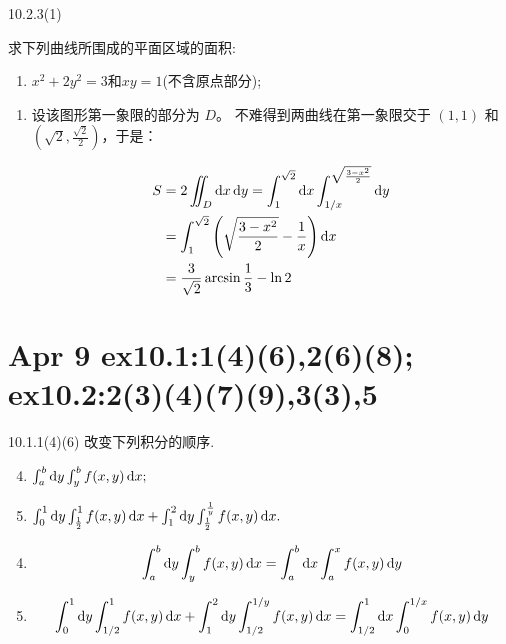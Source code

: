 \begin{exercise}
    {10.2.3(1)}

    求下列曲线所围成的平面区域的面积:
    \begin{enumerate}
        \item $x^2+2y^2 = 3$和$xy=1$(不含原点部分);
    \end{enumerate}
\end{exercise}

\begin{solution}
    \begin{enumerate}
        \item 设该图形第一象限的部分为 $D$。  
        不难得到两曲线在第一象限交于 $(1, 1)$ 和 $\left( \sqrt{2}, \frac{\sqrt{2}}{2} \right)$，于是：
        
        \begin{align*}
        S &= 2 \iint_D \operatorname{d\!} x \operatorname{d\!} y 
        = \int_1^{\sqrt{2}} \operatorname{d\!} x \int_{1/x}^{\sqrt{\frac{3 - x^2}{2}}} \operatorname{d\!} y \\
        &= \int_1^{\sqrt{2}} \left( \sqrt{\frac{3 - x^2}{2}} - \frac{1}{x} \right) \operatorname{d\!} x \\
        &= \frac{3}{\sqrt{2}} \arcsin \frac{1}{3} - \ln 2
        \end{align*}
    \end{enumerate}
\end{solution}



\section{Apr 9 ex10.1:1(4)(6),2(6)(8); ex10.2:2(3)(4)(7)(9),3(3),5}

\begin{exercise}
    {10.1.1(4)(6)}
    改变下列积分的顺序.

    \begin{enumerate}
        \setcounter{enumi}{3}
        \item $\int_a^b \operatorname{d\!} y \int_y^b f(x,y) \operatorname{d\!} x;$
        \setcounter{enumi}{5}
        \item $\int_0^1 \operatorname{d\!} y \int_{\frac{1}{2}}^1 f(x,y) \operatorname{d\!} x + \int_1^2 \operatorname{d\!} y \int_{\frac12}^{\frac{1}{y}} f(x,y) \operatorname{d\!} x.$
    \end{enumerate}
\end{exercise}

\begin{solution}
    \begin{enumerate}
        \setcounter{enumi}{3}
        \item \[
\int_a^b \operatorname{d\!} y \int_y^b f(x,y) \operatorname{d\!} x = \int_a^b \operatorname{d\!} x \int_a^x f(x,y) \operatorname{d\!} y
\]
        \setcounter{enumi}{5}
        \item \[
\int_0^1 \operatorname{d\!} y \int_{1/2}^1 f(x,y) \operatorname{d\!} x + \int_1^2 \operatorname{d\!} y \int_{1/2}^{1/y} f(x,y) \operatorname{d\!} x = \int_{1/2}^1 \operatorname{d\!} x \int_0^{1/x} f(x,y) \operatorname{d\!} y
\]
    \end{enumerate}
\end{solution}

